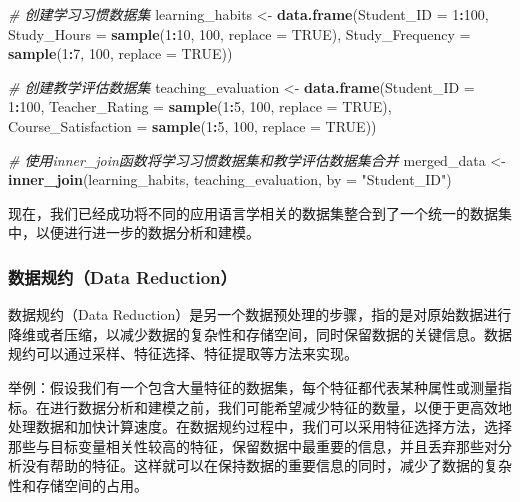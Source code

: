 \documentclass[]{book}
\newenvironment{Shaded}{\begin{snugshade}}{\end{snugshade}}
\newcommand{\CommentTok}[1]{\textcolor[rgb]{0.56,0.35,0.01}{\textit{#1}}}
\newcommand{\DataTypeTok}[1]{\textcolor[rgb]{0.13,0.29,0.53}{#1}}
\newcommand{\DecValTok}[1]{\textcolor[rgb]{0.00,0.00,0.81}{#1}}
\newcommand{\KeywordTok}[1]{\textcolor[rgb]{0.13,0.29,0.53}{\textbf{#1}}}
\newcommand{\NormalTok}[1]{#1}
\newcommand{\OperatorTok}[1]{\textcolor[rgb]{0.81,0.36,0.00}{\textbf{#1}}}
\newcommand{\OtherTok}[1]{\textcolor[rgb]{0.56,0.35,0.01}{#1}}
\newcommand{\StringTok}[1]{\textcolor[rgb]{0.31,0.60,0.02}{#1}}
\begin{document}
\begin{Shaded}
\begin{Highlighting}[]
\CommentTok{# 创建学习习惯数据集}
\NormalTok{learning_habits <-}\StringTok{ }\KeywordTok{data.frame}\NormalTok{(}\DataTypeTok{Student_ID =} \DecValTok{1}\OperatorTok{:}\DecValTok{100}\NormalTok{,}
                          \DataTypeTok{Study_Hours =} \KeywordTok{sample}\NormalTok{(}\DecValTok{1}\OperatorTok{:}\DecValTok{10}\NormalTok{, }\DecValTok{100}\NormalTok{, }\DataTypeTok{replace =} \OtherTok{TRUE}\NormalTok{),}
                          \DataTypeTok{Study_Frequency =} \KeywordTok{sample}\NormalTok{(}\DecValTok{1}\OperatorTok{:}\DecValTok{7}\NormalTok{, }\DecValTok{100}\NormalTok{, }\DataTypeTok{replace =} \OtherTok{TRUE}\NormalTok{))}

\CommentTok{# 创建教学评估数据集}
\NormalTok{teaching_evaluation <-}\StringTok{ }\KeywordTok{data.frame}\NormalTok{(}\DataTypeTok{Student_ID =} \DecValTok{1}\OperatorTok{:}\DecValTok{100}\NormalTok{,}
                              \DataTypeTok{Teacher_Rating =} \KeywordTok{sample}\NormalTok{(}\DecValTok{1}\OperatorTok{:}\DecValTok{5}\NormalTok{, }\DecValTok{100}\NormalTok{, }\DataTypeTok{replace =} \OtherTok{TRUE}\NormalTok{),}
                              \DataTypeTok{Course_Satisfaction =} \KeywordTok{sample}\NormalTok{(}\DecValTok{1}\OperatorTok{:}\DecValTok{5}\NormalTok{, }\DecValTok{100}\NormalTok{, }\DataTypeTok{replace =} \OtherTok{TRUE}\NormalTok{))}

\CommentTok{# 使用inner_join函数将学习习惯数据集和教学评估数据集合并}
\NormalTok{merged_data <-}\StringTok{ }\KeywordTok{inner_join}\NormalTok{(learning_habits, teaching_evaluation, }\DataTypeTok{by =} \StringTok{"Student_ID"}\NormalTok{)}
\end{Highlighting}
\end{Shaded}

现在，我们已经成功将不同的应用语言学相关的数据集整合到了一个统一的数据集中，以便进行进一步的数据分析和建模。

\hypertarget{ux6570ux636eux89c4ux7ea6data-reduction}{%
\subsubsection{数据规约（Data Reduction）}\label{ux6570ux636eux89c4ux7ea6data-reduction}}

数据规约（Data Reduction）是另一个数据预处理的步骤，指的是对原始数据进行降维或者压缩，以减少数据的复杂性和存储空间，同时保留数据的关键信息。数据规约可以通过采样、特征选择、特征提取等方法来实现。

举例：假设我们有一个包含大量特征的数据集，每个特征都代表某种属性或测量指标。在进行数据分析和建模之前，我们可能希望减少特征的数量，以便于更高效地处理数据和加快计算速度。在数据规约过程中，我们可以采用特征选择方法，选择那些与目标变量相关性较高的特征，保留数据中最重要的信息，并且丢弃那些对分析没有帮助的特征。这样就可以在保持数据的重要信息的同时，减少了数据的复杂性和存储空间的占用。
\end{document}
